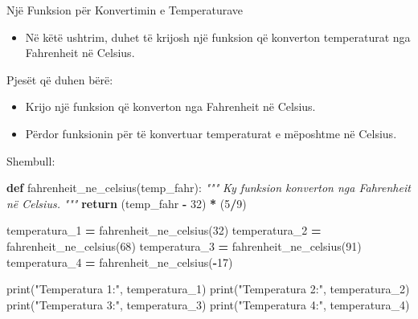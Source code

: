 \documentclass[
  ignorenonframetext,
]{beamer}
\newenvironment{Shaded}{\begin{snugshade}}{\end{snugshade}}
\newcommand{\BuiltInTok}[1]{#1}
\newcommand{\CommentTok}[1]{\textcolor[rgb]{0.56,0.35,0.01}{\textit{#1}}}
\newcommand{\ControlFlowTok}[1]{\textcolor[rgb]{0.13,0.29,0.53}{\textbf{#1}}}
\newcommand{\DecValTok}[1]{\textcolor[rgb]{0.00,0.00,0.81}{#1}}
\newcommand{\KeywordTok}[1]{\textcolor[rgb]{0.13,0.29,0.53}{\textbf{#1}}}
\newcommand{\NormalTok}[1]{#1}
\newcommand{\OperatorTok}[1]{\textcolor[rgb]{0.81,0.36,0.00}{\textbf{#1}}}
\newcommand{\StringTok}[1]{\textcolor[rgb]{0.31,0.60,0.02}{#1}}
\providecommand{\tightlist}{%
  \setlength{\itemsep}{0pt}\setlength{\parskip}{0pt}}
\begin{document}
\begin{frame}{Një Funksion për Konvertimin e Temperaturave}
\protect\hypertarget{njuxeb-funksion-puxebr-konvertimin-e-temperaturave}{}
\begin{itemize}
\tightlist
\item
  Në këtë ushtrim, duhet të krijosh një funksion që konverton
  temperaturat nga Fahrenheit në Celsius.
\end{itemize}
\end{frame}

\begin{frame}{Pjesët që duhen bërë:}
\protect\hypertarget{pjesuxebt-quxeb-duhen-buxebruxeb-5}{}
\begin{itemize}
\item
  Krijo një funksion që konverton nga Fahrenheit në Celsius.
\item
  Përdor funksionin për të konvertuar temperaturat e mëposhtme në
  Celsius.
\end{itemize}
\end{frame}

\begin{frame}[fragile]{Shembull:}
\protect\hypertarget{shembull-7}{}
\begin{Shaded}
\begin{Highlighting}[]
\KeywordTok{def}\NormalTok{ fahrenheit\_ne\_celsius(temp\_fahr):}
    \CommentTok{"""}
\CommentTok{    Ky funksion konverton nga Fahrenheit në Celsius.}
\CommentTok{    """}
    \ControlFlowTok{return}\NormalTok{ (temp\_fahr }\OperatorTok{{-}} \DecValTok{32}\NormalTok{) }\OperatorTok{*}\NormalTok{ (}\DecValTok{5}\OperatorTok{/}\DecValTok{9}\NormalTok{)}

\NormalTok{temperatura\_1 }\OperatorTok{=}\NormalTok{ fahrenheit\_ne\_celsius(}\DecValTok{32}\NormalTok{)}
\NormalTok{temperatura\_2 }\OperatorTok{=}\NormalTok{ fahrenheit\_ne\_celsius(}\DecValTok{68}\NormalTok{)}
\NormalTok{temperatura\_3 }\OperatorTok{=}\NormalTok{ fahrenheit\_ne\_celsius(}\DecValTok{91}\NormalTok{)}
\NormalTok{temperatura\_4 }\OperatorTok{=}\NormalTok{ fahrenheit\_ne\_celsius(}\OperatorTok{{-}}\DecValTok{17}\NormalTok{)}

\BuiltInTok{print}\NormalTok{(}\StringTok{"Temperatura 1:"}\NormalTok{, temperatura\_1)}
\BuiltInTok{print}\NormalTok{(}\StringTok{"Temperatura 2:"}\NormalTok{, temperatura\_2)}
\BuiltInTok{print}\NormalTok{(}\StringTok{"Temperatura 3:"}\NormalTok{, temperatura\_3)}
\BuiltInTok{print}\NormalTok{(}\StringTok{"Temperatura 4:"}\NormalTok{, temperatura\_4)}
\end{Highlighting}
\end{Shaded}
\end{frame}
\end{document}
